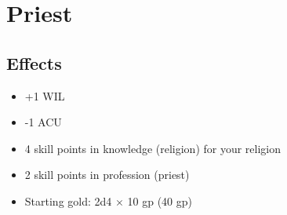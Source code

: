 \section{Priest}\label{background:priest}

\subsection{Effects}
\begin{itemize}
    \item +1 WIL
    \item -1 ACU
    \item 4 skill points in knowledge (religion) for your religion
    \item 2 skill points in profession (priest)
    \item Starting gold: 2d4 $\times$ 10 gp (40 gp)
\end{itemize}
